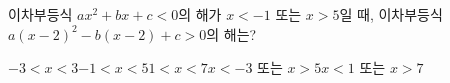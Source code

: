 이차부등식 $ax^2+bx+c<0$의 해가 $x<-1$ 또는 $x>5$일 때, 이차부등식 $a(x-2)^2-b(x-2)+c>0$의 해는? 
\begin{choicesii}{$-3<x<3$}{$-1<x<5$}{$1<x<7$}{$x<-3$ 또는 $x>5$}{$x<1$ 또는 $x>7$}\end{choicesii}
